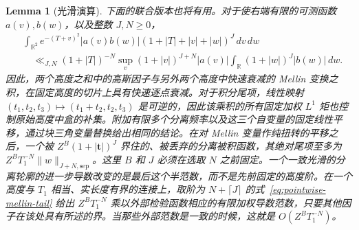 \documentclass[11pt,a4paper]{article}
\numberwithin{equation}{section}
\numberwithin{figure}{section}
\newtheorem{lemma}[theorem]{Lemma}
\theoremstyle{definition}
\theoremstyle{remark}
\begin{document}
\begin{lemma}[光滑演算]
下面的联合版本也将有用。对于使右端有限的可测函数 $a(v),b(w)$，以及整数 $J,N\ge0$，
\begin{equation}\label{eq:joint-gaussian-slice}
 \begin{split}
 &\int_{\mathbb R^2}e^{-(T+v)^2}|a(v)b(w)|
       (1+|T|+|v|+|w|)^J\,dv\,dw\\
 &\quad\ll_{J,N}(1+|T|)^{-N}
       \sup_v(1+|v|)^{J+N}|a(v)|
       \int_{\mathbb R}(1+|w|)^J|b(w)|\,dw.
 \end{split}
\end{equation}
因此，两个高度之和中的高斯因子与另外两个高度中快速衰减的 Mellin 变换之积，在固定高度的切片上具有快速逐点衰减。对于积分尾项，线性映射 $(t_1,t_2,t_3)\mapsto(t_1+t_2,t_2,t_3)$ 是可逆的，因此该乘积的所有固定加权 $L^1$ 矩也控制原始高度中盒的补集。附加有限多个分离频率以及这三个自变量的固定线性平移，通过块三角变量替换给出相同的结论。在对 Mellin 变量作纯扭转的平移之后，一个被 $Z^B(1+|\boldsymbol t|)^J$ 界住的、被丢弃的分离被积函数，其绝对尾项至多为
$Z^BT_1^{-N}\|w\|_{J+N,\mathrm{sep}}$。这里 $B$ 和 $J$ 必须在选取 $N$ 之前固定。一个一致光滑的分离轮廓的进一步导数改变的是最后这个半范数，而不是先前固定的高度阶。在一个高度与 $T_1$ 相当、实长度有界的连接上，取阶为 $N+\lceil J\rceil$ 的式~\eqref{eq:pointwise-mellin-tail} 给出 $Z^BT_1^{-N}$ 乘以外部检验函数相应的有限加权导数范数，只要其他因子在该处具有所述的界。当那些外部范数是一致的时候，这就是 $O(Z^BT_1^{-N})$。
\end{lemma}
\end{document}

